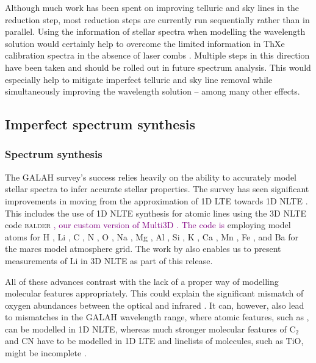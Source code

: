 \documentclass[
  journal=pasa,
  manuscript=research-paper, %
  year=2024,
  volume=37
]{cup-journal}
\newcommand\ion[2]{\text{#1\,\textsc{\lowercase{#2}}}}	%
\newcommand{\adjusted}[1]{{\textcolor{purple}{#1}}}
\begin{document}
Although much work has been spent on improving telluric and sky lines in the reduction step, most reduction steps are currently run sequentially rather than in parallel. Using the information of stellar spectra when modelling the wavelength solution would certainly help to overcome the limited information in ThXe calibration spectra in the absence of laser combs \citep{Kos2018b}. Multiple steps in this direction have been taken \citep{Saydjari2023} and should be rolled out in future spectrum analysis. This would especially help to mitigate imperfect telluric and sky line removal while simultaneously improving the wavelength solution -- among many other effects.

\subsection{Imperfect spectrum synthesis} \label{sec:caveats_synthesis}

\subsubsection{Spectrum synthesis}

The GALAH survey's success relies heavily on the ability to accurately model stellar spectra to infer accurate stellar properties. The survey has seen significant improvements in moving from the approximation of 1D LTE towards 1D NLTE \citep{Amarsi2020}. This includes the use of 1D NLTE synthesis for atomic lines using the 3D NLTE code \textsc{balder} \citep{Amarsi2018}\adjusted{, our custom version of Multi3D \citep{Botnen1999, Leenaarts2009}. The code is }employing model atoms for H  \citep{Amarsi2018}, Li \citep{Lind2009, Wang2021}, C \citep{Amarsi2019}, N \citep{Amarsi2020b}, O \citep{Amarsi2018b}, Na \citep{Lind2011}, Mg \citep{Osorio2015}, Al \citep{Nordlander2017}, Si \citep{Amarsi2017}, K \citep{Reggiani2019}, Ca \citep{Osorio2019}, Mn \citep{Bergemann2019b}, Fe \citep{Amarsi2018, Amarsi2022}, and Ba \citep{Gallagher2020} for the {\sc marcs} model atmosphere grid. The work by \citet{Wang2024} also enables us to present measurements of Li in 3D NLTE as part of this release.

All of these advances contrast with the lack of a proper way of modelling molecular features appropriately. This could explain the significant mismatch of oxygen abundances between the optical and infrared \citep[compare e.g.][]{Bensby2014, SDSSDR17}. It can, however, also lead to mismatches in the GALAH wavelength range, where atomic features, such as \ion{C}{I}, can be modelled in 1D NLTE, whereas much stronger molecular features of $\mathrm{C}_2$ and CN have to be modelled in 1D LTE and linelists of molecules, such as TiO, might be incomplete \citep{Hoeijmakers2015, McKemmish2019}.
\end{document}
